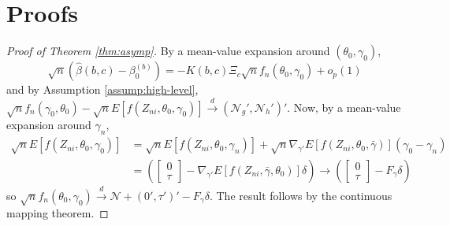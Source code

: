 \section*{Proofs}
\begin{proof}[Proof of Theorem \ref{thm:asymp}]
By a mean-value expansion around $(\theta_0,\gamma_0)$,
	$$\sqrt{n}\left(\widehat{\beta}(b,c) - \beta_0^{(b)}\right) = - K(b,c)\Xi_c \sqrt{n} f_n(\theta_0,\gamma_0) + o_p(1)$$
  and by Assumption \ref{assump:high-level},
$\sqrt{n} f_n(\gamma_0,\theta_0) - \sqrt{n}E\left[f(Z_{ni},\theta_0, \gamma_0) \right]\overset{d}{\rightarrow} (\mathscr{N}_g', \mathscr{N}_h')'$. 
Now, by a mean-value expansion around $\gamma_n$,
	\begin{align*}
		\sqrt{n}E\left[ f(Z_{ni}, \theta_0,\gamma_0) \right] &= \sqrt{n}E\left[ f(Z_{ni}, \theta_0, \gamma_n) \right] + \sqrt{n}\nabla_{\gamma'}E\left[ f(Z_{ni}, \theta_0,\bar{\gamma}) \right] (\gamma_0 -\gamma_n)\\
			&=\left(\left[ \begin{array}{c} 0\\ \tau\end{array}\right] - \nabla_{\gamma'}E\left[ f(Z_{ni}, \bar{\gamma},\theta_0) \right] \delta\right) \rightarrow \left(\left[ \begin{array}{c} 0\\ \tau\end{array}\right] - F_\gamma\delta\right)
	\end{align*}
  so $\sqrt{n}f_n(\theta_0, \gamma_0) \overset{d}{\rightarrow} \mathscr{N} + (0', \tau')' - F_\gamma \delta$.
  The result follows by the continuous mapping theorem.
\end{proof}

